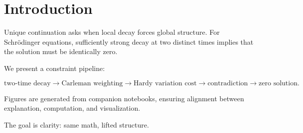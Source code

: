 \section{Introduction}

Unique continuation asks when local decay forces global structure.
For Schrödinger equations, sufficiently strong decay at two distinct times implies that the solution must be identically zero.

We present a constraint pipeline:

\[
\text{two-time decay}
\rightarrow
\text{Carleman weighting}
\rightarrow
\text{Hardy variation cost}
\rightarrow
\text{contradiction}
\rightarrow
\text{zero solution}.
\]

Figures are generated from companion notebooks, ensuring alignment between explanation, computation, and visualization.

The goal is clarity: same math, lifted structure.
